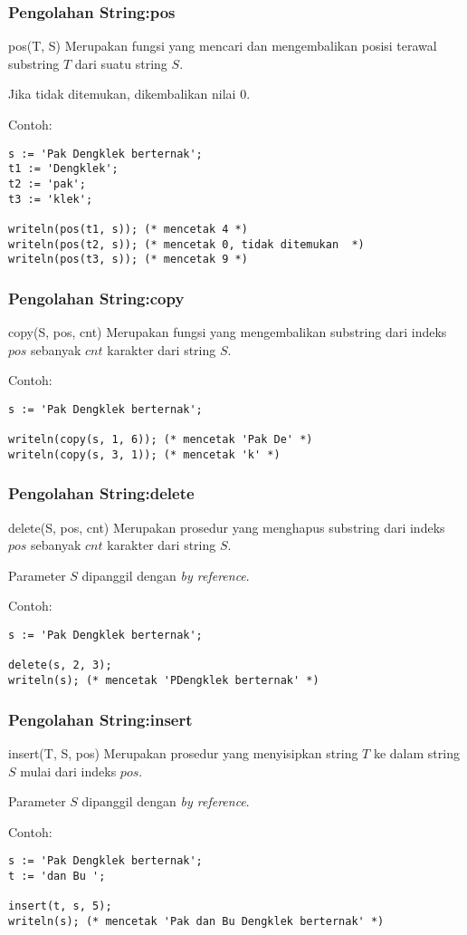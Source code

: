 \documentclass{beamer}
\begin{document}
\begin{frame}[fragile]
\frametitle{Pengolahan String:\newline pos}
\begin{block}{pos(T, S)}
Merupakan fungsi yang mencari dan mengembalikan posisi terawal substring $T$ dari suatu string $S$.

Jika tidak ditemukan, dikembalikan nilai 0.
\end{block}
Contoh:
\begin{lstlisting}
s := 'Pak Dengklek berternak';
t1 := 'Dengklek';
t2 := 'pak';
t3 := 'klek';

writeln(pos(t1, s)); (* mencetak 4 *)
writeln(pos(t2, s)); (* mencetak 0, tidak ditemukan  *)
writeln(pos(t3, s)); (* mencetak 9 *)
\end{lstlisting}
\end{frame}

\begin{frame}[fragile]
\frametitle{Pengolahan String:\newline copy}
\begin{block}{copy(S, pos, cnt)}
Merupakan fungsi yang mengembalikan substring dari indeks $pos$ sebanyak $cnt$ karakter dari string $S$.
\end{block}
Contoh:
\begin{lstlisting}
s := 'Pak Dengklek berternak';

writeln(copy(s, 1, 6)); (* mencetak 'Pak De' *)
writeln(copy(s, 3, 1)); (* mencetak 'k' *)
\end{lstlisting}
\end{frame}

\begin{frame}[fragile]
\frametitle{Pengolahan String:\newline delete}
\begin{block}{delete(S, pos, cnt)}
Merupakan prosedur yang menghapus substring dari indeks $pos$ sebanyak $cnt$ karakter dari string $S$.

Parameter $S$ dipanggil dengan \textit{by reference}.
\end{block}
Contoh:
\begin{lstlisting}
s := 'Pak Dengklek berternak';

delete(s, 2, 3);
writeln(s); (* mencetak 'PDengklek berternak' *)
\end{lstlisting}
\end{frame}

\begin{frame}[fragile]
\frametitle{Pengolahan String:\newline insert}
\begin{block}{insert(T, S, pos)}
Merupakan prosedur yang menyisipkan string $T$ ke dalam string $S$ mulai dari indeks $pos$.

Parameter $S$ dipanggil dengan \textit{by reference}.
\end{block}
Contoh:
\begin{lstlisting}
s := 'Pak Dengklek berternak';
t := 'dan Bu ';

insert(t, s, 5);
writeln(s); (* mencetak 'Pak dan Bu Dengklek berternak' *)
\end{lstlisting}
\end{frame}
\end{document}
